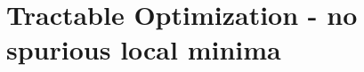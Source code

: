 \graphicspath{{chapters/gradient_descent/}}
\section{Tractable Optimization - no spurious local minima}